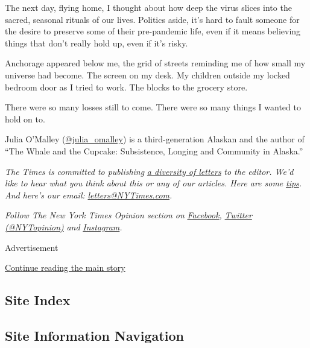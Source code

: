 The next day, flying home, I thought about how deep the virus slices
into the sacred, seasonal rituals of our lives. Politics aside, it's
hard to fault someone for the desire to preserve some of their
pre-pandemic life, even if it means believing things that don't really
hold up, even if it's risky.

Anchorage appeared below me, the grid of streets reminding me of how
small my universe had become. The screen on my desk. My children outside
my locked bedroom door as I tried to work. The blocks to the grocery
store.

There were so many losses still to come. There were so many things I
wanted to hold on to.

Julia O'Malley
(\href{https://twitter.com/julia_omalley}{@julia\_omalley}) is a
third-generation Alaskan and the author of ``The Whale and the Cupcake:
Subsistence, Longing and Community in Alaska.''

\emph{The Times is committed to publishing}
\href{https://www.nytimes3xbfgragh.onion/2019/01/31/opinion/letters/letters-to-editor-new-york-times-women.html}{\emph{a
diversity of letters}} \emph{to the editor. We'd like to hear what you
think about this or any of our articles. Here are some}
\href{https://help.nytimes3xbfgragh.onion/hc/en-us/articles/115014925288-How-to-submit-a-letter-to-the-editor}{\emph{tips}}\emph{.
And here's our email:}
\href{mailto:letters@NYTimes.com}{\emph{letters@NYTimes.com}}\emph{.}

\emph{Follow The New York Times Opinion section on}
\href{https://www.facebookcorewwwi.onion/nytopinion}{\emph{Facebook}}\emph{,}
\href{http://twitter.com/NYTOpinion}{\emph{Twitter (@NYTopinion)}}
\emph{and}
\href{https://www.instagram.com/nytopinion/}{\emph{Instagram}}\emph{.}

Advertisement

\protect\hyperlink{after-bottom}{Continue reading the main story}

\hypertarget{site-index}{%
\subsection{Site Index}\label{site-index}}

\hypertarget{site-information-navigation}{%
\subsection{Site Information
Navigation}\label{site-information-navigation}}

